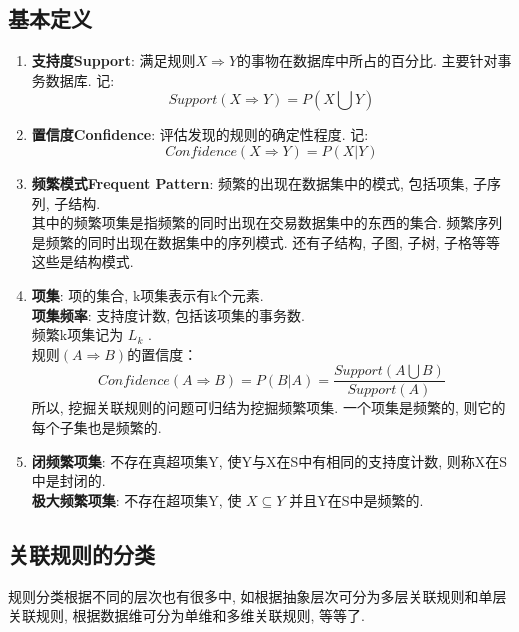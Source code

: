 \documentclass[a4paper,10pt,english]{article}
\begin{document}
\subsection{基本定义}
\begin{enumerate}
\item
\textbf{支持度Support}: 满足规则$X \Rightarrow Y$的事物在数据库中所占的百分比. 主要针对事务数据库.  记: $$Support(X \Rightarrow Y)=P(X \bigcup Y)$$
\item
\textbf{置信度Confidence}: 评估发现的规则的确定性程度. 记: $$Confidence(X \Rightarrow Y)=P(X|Y)$$

\item
\textbf{频繁模式Frequent Pattern}: 频繁的出现在数据集中的模式, 包括项集, 子序列, 子结构. \\
其中的频繁项集是指频繁的同时出现在交易数据集中的东西的集合. 频繁序列是频繁的同时出现在数据集中的序列模式. 还有子结构, 子图, 子树, 子格等等这些是结构模式. 

\item
\textbf{项集}: 项的集合, k项集表示有k个元素. \\
\textbf{项集频率}: 支持度计数, 包括该项集的事务数. \\
频繁k项集记为 $L_{k}$ . \\
规则$(A \Rightarrow B)$的置信度：
$$Confidence(A \Rightarrow B)=P(B|A)=\frac{Support(A \bigcup B)}{Support(A)}$$
所以, 挖掘关联规则的问题可归结为挖掘频繁项集. 一个项集是频繁的, 则它的每个子集也是频繁的. 

\item
\textbf{闭频繁项集}: 不存在真超项集Y, 使Y与X在S中有相同的支持度计数, 则称X在S中是封闭的. \\
\textbf{极大频繁项集}: 不存在超项集Y, 使 $X \subseteq Y$ 并且Y在S中是频繁的. 
\end{enumerate}

\subsection{关联规则的分类}
规则分类根据不同的层次也有很多中, 如根据抽象层次可分为多层关联规则和单层关联规则, 根据数据维可分为单维和多维关联规则, 等等了.
\end{document}
